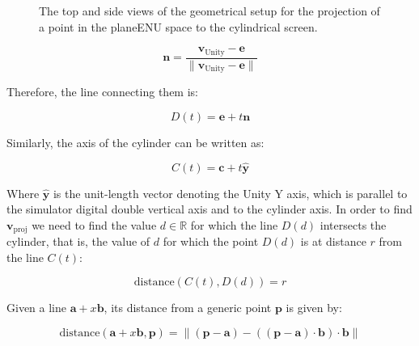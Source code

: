 \begin{figure}
  \centering
  \hspace{1cm}
  \caption{The top and side views of the geometrical setup for the projection of a point in the \gls{planeENU} space to the cylindrical screen.}\label{projection_setup.png}
\end{figure}

\begin{equation}
    \mathbf{n} = \frac{\mathbf{v}_{\text{Unity}} - \mathbf{e}}{\lVert\mathbf{v}_{\text{Unity}} - \mathbf{e}\rVert}
\end{equation}

Therefore, the line connecting them is:

\begin{equation}
    D(t) = \mathbf{e} + t \mathbf{n}
\end{equation}

Similarly, the axis of the cylinder can be written as:

\begin{equation}
    C(t) = \mathbf{c} + t \hat{\mathbf{y}}
\end{equation}

Where $\hat{\mathbf{y}}$ is the unit-length vector denoting the Unity Y axis, which is parallel to the simulator digital double vertical axis and to the cylinder axis. In order to find $\mathbf{v}_{\text{proj}}$ we need to find the value $d \in \mathbb{R}$ for which the line $D(d)$ intersects the cylinder, that is, the value of $d$ for which the point $D(d)$ is at distance $r$ from the line $C(t)$:

\begin{equation}
    \label{eq:projection_condition}
    \text{distance}\left(C(t), D(d)\right) = r
\end{equation}

Given a line $\mathbf{a} + x \mathbf{b}$, its distance from a generic point $\mathbf{p}$ is given by\cite{noauthor_distance_2021}:

\begin{equation}
    \text{distance}\left(\mathbf{a} + x\mathbf{b}, \mathbf{p}\right) = \lVert \left(\mathbf{p} - \mathbf{a}\right) - \left(\left(\mathbf{p} - \mathbf{a}\right) \cdot \mathbf{b} \right) \cdot \mathbf{b} \rVert
\end{equation}

